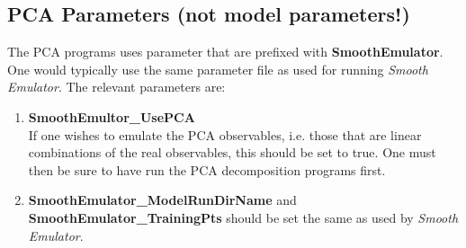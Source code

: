 \documentclass[UserManual.tex]{subfiles}
\begin{document}
\subsection{PCA Parameters (not model parameters!)}
The PCA programs uses parameter that are prefixed with {\bf SmoothEmulator}. One would typically use the same parameter file as used for running {\it Smooth Emulator}. The relevant parameters are:
\begin{enumerate}\itemsep=0pt
\item {\bf SmoothEmultor\_UsePCA}\\
If one wishes to emulate the PCA observables, i.e. those that are linear combinations of the real observables, this should be set to true. One must then be sure to have run the PCA decomposition programs first. 
\item {\bf SmoothEmulator\_ModelRunDirName} and {\bf SmoothEmulator\_TrainingPts} should be set the same as used by {\it Smooth Emulator}.
\end{enumerate}
\end{document}
